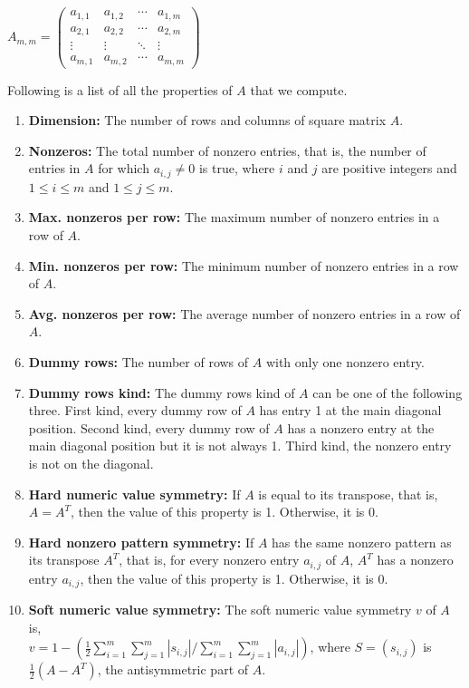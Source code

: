 \begin{center}
  $A_{m,m} =
 \begin{pmatrix}
  a_{1,1} & a_{1,2} & \cdots & a_{1,m} \\
  a_{2,1} & a_{2,2} & \cdots & a_{2,m} \\
  \vdots  & \vdots  & \ddots & \vdots  \\
  a_{m,1} & a_{m,2} & \cdots & a_{m,m}
 \end{pmatrix}$
\end{center}

\noindent Following is a list of all the properties of $A$ that we compute. 

\begin{enumerate}
\item \textbf{Dimension:} The number of rows and columns of square matrix $A$.
\item \textbf{Nonzeros:} The total number of nonzero entries, that is, the number of entries in $A$ for which $a_{i,j} \neq 0$ is true, where $i$ and $j$ are positive integers and $1 \leq i \leq m$ and $1 \leq j \leq m$.
\item \textbf{Max. nonzeros per row:} The maximum number of nonzero entries in a row of $A$.
\item \textbf{Min. nonzeros per row:} The minimum number of nonzero entries in a row of $A$.
\item \textbf{Avg. nonzeros per row:} The average number of nonzero entries in a row of $A$. 
\item \textbf{Dummy rows:} The number of rows of $A$ with only one nonzero entry.
\item \textbf{Dummy rows kind:} The dummy rows kind of $A$ can be one of the following three. First kind, every dummy row of $A$ has entry 1 at the main diagonal position. Second kind, every dummy row of $A$ has a nonzero entry at the main diagonal position but it is not always 1. Third kind, the nonzero entry is not on the diagonal.
\item \textbf{Hard numeric value symmetry:} If $A$ is equal to its transpose, that is, $A=A^{T}$, then the value of this property is 1. Otherwise, it is 0.
\item \textbf{Hard nonzero pattern symmetry:} If $A$ has the same nonzero pattern as its transpose $A^{T}$, that is, for every nonzero entry $a_{i,j}$ of $A$, $A^{T}$ has a nonzero entry $a_{i,j}$, then the value of this property is 1. Otherwise, it is 0.
\item \textbf{Soft numeric value symmetry:} The soft numeric value symmetry $v$ of $A$ is, \\ $v=1-(\frac{1}{2}\sum_{i=1}^{m}\sum_{j=1}^{m}|s_{i,j}| / \sum_{i=1}^{m}\sum_{j=1}^{m}|a_{i,j}|)$, where $S = (s_{i,j})$ is $\frac{1}{2}(A - A^{T})$, the antisymmetric part of $A$.

\end{enumerate}
